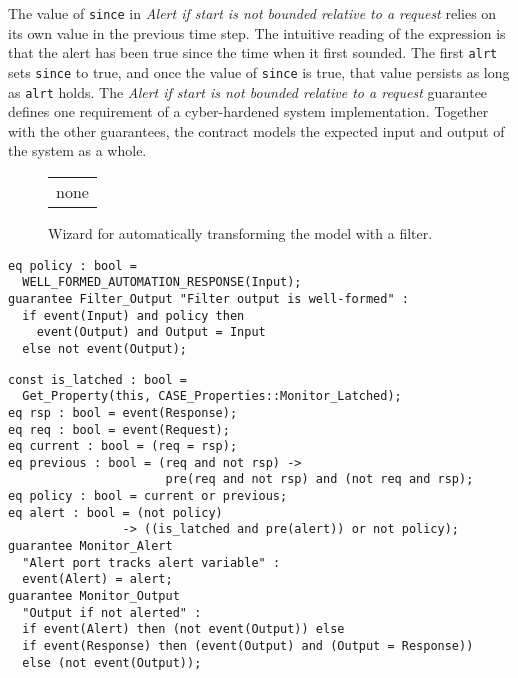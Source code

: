 The value of \texttt{since} in \emph{Alert if start is not bounded relative to a request} relies on its own value in the previous time step. The intuitive reading of the expression is that the alert has been true since the time when it first sounded. The first \texttt{alrt} sets \texttt{since} to true, and once the value of \texttt{since} is true, that value persists as long as \texttt{alrt} holds. The \emph{Alert if start is not bounded relative to a request} guarantee defines one requirement of a cyber-hardened system implementation. Together with the other guarantees, the contract models the expected input and output of the system as a whole.

\begin{figure}
  \begin{center}
    \begin{tabular}{c}
      none
    \end{tabular}
  \end{center}
  \caption{Wizard for automatically transforming the model with a filter.}
  \label{fig:dialogue}
\end{figure}

\newsavebox{\flt}
\begin{lrbox}{\flt}
\begin{lstlisting}[style=agree]
eq policy : bool =
  WELL_FORMED_AUTOMATION_RESPONSE(Input);
guarantee Filter_Output "Filter output is well-formed" :
  if event(Input) and policy then
    event(Output) and Output = Input
  else not event(Output);
\end{lstlisting}
\end{lrbox}

\newsavebox{\mntr}
\begin{lrbox}{\mntr}
\begin{lstlisting}[style=agree]
const is_latched : bool =
  Get_Property(this, CASE_Properties::Monitor_Latched);
eq rsp : bool = event(Response);
eq req : bool = event(Request);
eq current : bool = (req = rsp);
eq previous : bool = (req and not rsp) ->
                      pre(req and not rsp) and (not req and rsp);
eq policy : bool = current or previous;
eq alert : bool = (not policy)
                -> ((is_latched and pre(alert)) or not policy);
guarantee Monitor_Alert
  "Alert port tracks alert variable" :
  event(Alert) = alert;
guarantee Monitor_Output
  "Output if not alerted" :
  if event(Alert) then (not event(Output)) else
  if event(Response) then (event(Output) and (Output = Response))
  else (not event(Output));
\end{lstlisting}
\end{lrbox}

